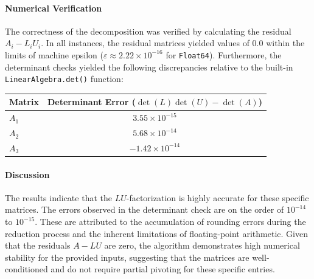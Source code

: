 \begin{solution}
  \paragraph{Numerical Verification}
  The correctness of the decomposition was verified by calculating the residual $A_i - L_i U_i$. In all instances, the residual matrices yielded values of $0.0$ within the limits of machine epsilon ($\varepsilon \approx 2.22 \times 10^{-16}$ for \texttt{Float64}). Furthermore, the determinant checks yielded the following discrepancies relative to the built-in \texttt{LinearAlgebra.det()} function:

  \begin{center}
    \centering
    \begin{tabular}{lc}
      \hline
      \textbf{Matrix} & \textbf{Determinant Error ($\det(L) \det(U) - \det(A)$)} \\ \hline
      $A_1$ & $3.55 \times 10^{-15}$ \\
      $A_2$ & $5.68 \times 10^{-14}$ \\
      $A_3$ & $-1.42 \times 10^{-14}$ \\ \hline
    \end{tabular}
  \end{center}

  \paragraph{Discussion}
  The results indicate that the $LU$-factorization is highly accurate for these specific matrices. The errors observed in the determinant check are on the order of $10^{-14}$ to $10^{-15}$. These are attributed to the accumulation of rounding errors during the reduction process and the inherent limitations of floating-point arithmetic. Given that the residuals $A - LU$ are zero, the algorithm demonstrates high numerical stability for the provided inputs, suggesting that the matrices are well-conditioned and do not require partial pivoting for these specific entries.
\end{solution}

